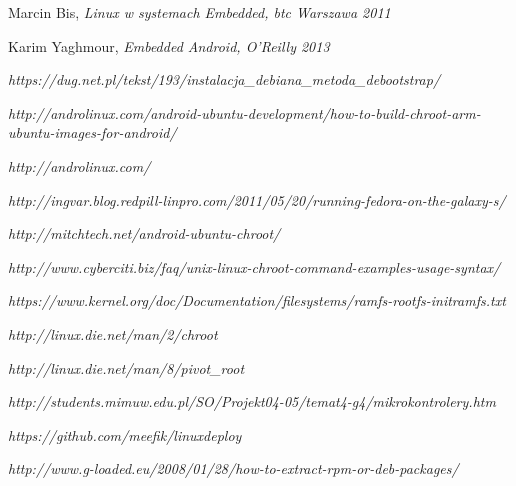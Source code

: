 \listoffigures
{}


\begin{thebibliography}{9}
	
	Marcin Bis,
	\emph{Linux w systemach Embedded, btc Warszawa 2011}
	
	Karim Yaghmour,
	\emph{Embedded Android, O'Reilly 2013}
	
	
	
	\emph{https://dug.net.pl/tekst/193/instalacja_debiana_metoda_debootstrap/
	}
	
	
	\emph{http://androlinux.com/android-ubuntu-development/how-to-build-chroot-arm-ubuntu-images-for-android/ }     
	
	
	
	\emph{http://androlinux.com/     }
	
	
	\emph{http://ingvar.blog.redpill-linpro.com/2011/05/20/running-fedora-on-the-galaxy-s/ }
	
	
	\emph{http://mitchtech.net/android-ubuntu-chroot/}
	
	
	\emph{http://www.cyberciti.biz/faq/unix-linux-chroot-command-examples-usage-syntax/              
	}
	
	\emph{https://www.kernel.org/doc/Documentation/filesystems/ramfs-rootfs-initramfs.txt }
	
	
	\emph{http://linux.die.net/man/2/chroot}
	
	\emph{http://linux.die.net/man/8/pivot_root}
	
	
	
	\emph{http://students.mimuw.edu.pl/SO/Projekt04-05/temat4-g4/mikrokontrolery.htm}                                
	
	\emph{https://github.com/meefik/linuxdeploy}  
	
	\emph{http://www.g-loaded.eu/2008/01/28/how-to-extract-rpm-or-deb-packages/}                                                                                                                 
\end{thebibliography} 



